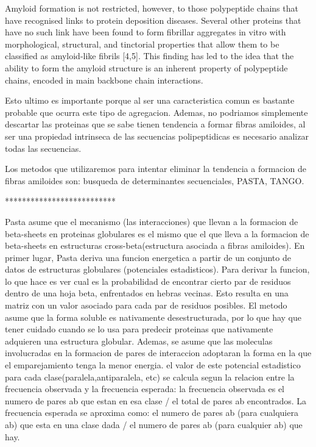 
Amyloid formation is not restricted, however, to those
polypeptide chains that have recognised links to protein
deposition diseases. Several other proteins that have no such
link have been found to form fibrillar aggregates in vitro with
morphological, structural, and tinctorial properties that
allow them to be classified as amyloid-like fibrils [4,5]. This
finding has led to the idea that the ability to form the amyloid
structure is an inherent property of polypeptide chains,
encoded in main backbone chain interactions.

Esto ultimo es importante porque al ser una caracteristica comun es bastante probable que ocurra este tipo de agregacion. Ademas, no podriamos simplemente descartar las proteinas que se sabe tienen tendencia a formar fibras amiloides, al ser una propiedad intrinseca de las secuencias polipeptidicas es necesario analizar todas las secuencias.


Los metodos que utilizaremos para intentar eliminar la tendencia a formacion de fibras amiloides son: busqueda de determinantes secuenciales, PASTA, TANGO.


**************************


Pasta asume que el mecanismo (las interacciones) que llevan a la formacion de beta-sheets en proteinas globulares es el mismo que el que lleva a la formacion de beta-sheets en estructuras cross-beta(estructura asociada a fibras amiloides).
En primer lugar, Pasta deriva una funcion energetica a partir de un conjunto de datos de estructuras globulares (potenciales estadisticos). Para derivar la funcion, lo que hace es ver cual es la probabilidad de encontrar cierto par de residuos dentro de una hoja beta, enfrentados en hebras vecinas. Esto resulta en una matriz con un valor asociado para cada par de residuos posibles.
El metodo asume que la forma soluble es nativamente desestructurada, por lo que hay que tener cuidado cuando se lo usa para predecir proteinas que nativamente adquieren una estructura globular.
Ademas, se asume que las moleculas involucradas en la formacion de pares de interaccion adoptaran la forma en la que el emparejamiento tenga la menor energia.
el valor de este potencial estadistico para cada clase(paralela,antiparalela, etc) se calcula segun la relacion entre la frecuencia observada y la frecuencia esperada:
la frecuencia observada es el numero de pares ab que estan en esa clase / el total de pares ab encontrados.
La frecuencia esperada se aproxima como: el numero de pares ab (para cualquiera ab) que esta en una clase dada / el numero de pares ab (para cualquier ab) que hay.

